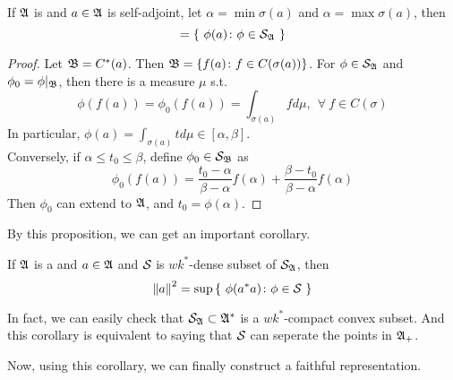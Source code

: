 \documentclass[a4paper,11pt]{report}
\begin{document}
\begin{prop}
	If $\mathfrak{A}$ is \Cs and $a \in \mathfrak{A}$ is self-adjoint, let $\alpha = \min{\sigma(a)}$ and $\alpha = \max{\sigma(a)}$, then
	\begin{equation*}
		[\alpha,\beta]= \{~\phi(a) \colon \phi \in \St_{\A}~\}
	\end{equation*}
\end{prop}
\begin{proof}
	Let $\mathfrak{B} = C^{*}(a)$. Then $\mathfrak{B} = \{f(a) \colon f \in C(\sigma(a))\}$. For $\phi \in \mathcal{S}_{\mathfrak{A}}$ and $\phi_0 =\phi|_{\mathfrak{B}}$, then there is a measure $\mu$ s.t.
	\begin{equation*}
		\phi(f(a))=\phi_0(f(a)) = \int_{\sigma(a)} f d \mu,~~ \forall~ f \in C(\sigma)
	\end{equation*}
	In particular, $\phi(a) = \int_{\sigma(a)} t d \mu \in [\alpha, \beta]$.\\
	Conversely, if $\alpha \leqslant t_0 \leqslant \beta$, define $\phi_0 \in \mathcal{S}_{\mathfrak{B}}$ as
	\begin{equation*}
		\phi_0(f(a)) = \frac{t_0 - \alpha}{\beta-\alpha}f(\alpha)+\frac{\beta - t_0}{\beta-\alpha}f(\alpha)
	\end{equation*}
	Then $\phi_0$ can extend to $\mathfrak{A}$, and $t_0 = \phi(\alpha)$.
\end{proof}

By this proposition, we can get an important corollary.

\begin{cor}
	If $\mathfrak{A}$ is a \Cs and $a \in \mathfrak{A}$ and $\mathcal{S}_{}$ is $wk^{*}$-dense subset of $\mathcal{S}_{\mathfrak{A}}$, then
	\begin{equation*}
		\left\lVert a\right\lVert^2 = \sup{\{~\phi(a^{*}a) \colon \phi \in \mathcal{S}_{}~\}}
	\end{equation*}
\end{cor}
\begin{rem}
	In fact, we can easily check that $\mathcal{S}_{\mathfrak{A}} \subset \mathfrak{A}^{*}$ is a $wk^{*}$-compact convex subset. And this corollary is equivalent to saying that $\mathcal{S}_{}$ can seperate the points in $\mathfrak{A}_{+}$.
\end{rem}

Now, using this corollary, we can finally construct a faithful representation.
\end{document}
